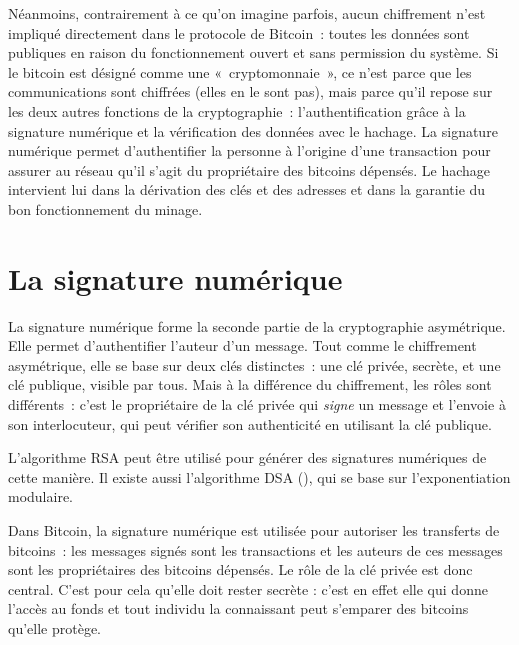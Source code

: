Néanmoins, contrairement à ce qu'on imagine parfois, aucun chiffrement n'est impliqué directement dans le protocole de Bitcoin~: toutes les données sont publiques en raison du fonctionnement ouvert et sans permission du système. Si le bitcoin est désigné comme une «~cryptomonnaie~», ce n'est parce que les communications sont chiffrées (elles en le sont pas), mais parce qu'il repose sur les deux autres fonctions de la cryptographie~: l'authentification grâce à la signature numérique et la vérification des données avec le hachage. La signature numérique permet d'authentifier la personne à l'origine d'une transaction pour assurer au réseau qu'il s'agit du propriétaire des bitcoins dépensés. Le hachage intervient lui dans la dérivation des clés et des adresses et dans la garantie du bon fonctionnement du minage.

\section*{La signature numérique}

La signature numérique forme la seconde partie de la cryptographie asymétrique. Elle permet d'authentifier l'auteur d'un message. Tout comme le chiffrement asymétrique, elle se base sur deux clés distinctes~: une clé privée, secrète, et une clé publique, visible par tous. Mais à la différence du chiffrement, les rôles sont différents~: c'est le propriétaire de la clé privée qui \emph{signe} un message et l'envoie à son interlocuteur, qui peut vérifier son authenticité en utilisant la clé publique. 

L'algorithme RSA peut être utilisé pour générer des signatures numériques de cette manière. Il existe aussi l'algorithme DSA (), qui se base sur l'exponentiation modulaire.

Dans Bitcoin, la signature numérique est utilisée pour autoriser les transferts de bitcoins~: les messages signés sont les transactions et les auteurs de ces messages sont les propriétaires des bitcoins dépensés. Le rôle de la clé privée est donc central. C'est pour cela qu'elle doit rester secrète : c'est en effet elle qui donne l'accès au fonds et tout individu la connaissant peut s'emparer des bitcoins qu'elle protège.



